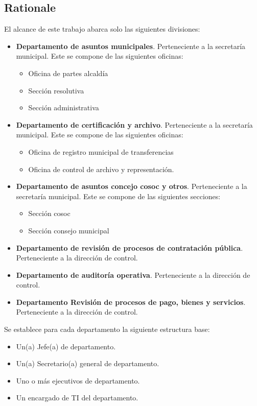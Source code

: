 \subsection{Rationale}
El alcance de este trabajo abarca solo las siguientes divisiones:
\begin{itemize}
	\item {
		\textbf{Departamento de asuntos municipales}. Perteneciente a la secretaría municipal. Este se compone de las siguientes oficinas:
		\begin{itemize}
			\item Oficina de partes alcaldía
			\item Sección resolutiva
			\item Sección administrativa
		\end{itemize}
	}
	\item {
		\textbf{Departamento de certificación y archivo}.  Perteneciente a la secretaría municipal. Este se compone de las siguientes oficinas:
		\begin{itemize}
			\item Oficina de registro municipal de transferencias
			\item Oficina de control de archivo y representación.
		\end{itemize}
	}
	\item {
		\textbf{Departamento de asuntos concejo cosoc y otros}.  Perteneciente a la secretaría municipal. Este se compone de las siguientes secciones:
		\begin{itemize}
			\item Sección cosoc
			\item Sección consejo municipal
		\end{itemize}
	}
	\item {
		\textbf{Departamento de revisión de procesos de contratación pública}.   Perteneciente a la dirección de control.
	}
	\item {
		\textbf{Departamento de auditoría operativa}.  Perteneciente a la dirección de control.
	}
	\item {
		\textbf{Departamento Revisión de procesos de pago, bienes y servicios}.  Perteneciente a la dirección de control. 
	}
\end{itemize}

Se establece para cada departamento la siguiente estructura base:
\begin{itemize}
	\item Un(a) Jefe(a) de departamento.
	\item Un(a) Secretario(a) general de departamento.
	\item Uno o más ejecutivos de departamento.
	\item Un encargado de TI del departamento.
\end{itemize}


